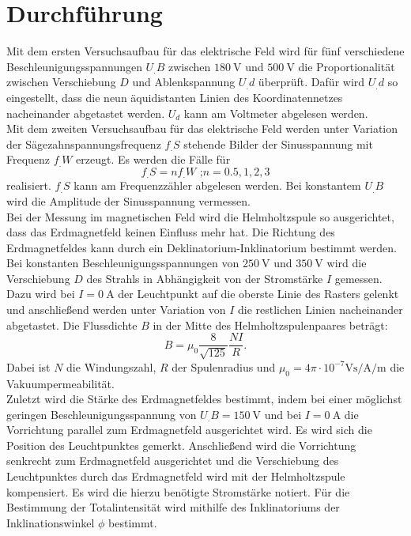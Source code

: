
\section{Durchführung}
\label{sec:Durchführung}

Mit dem ersten Versuchsaufbau für das elektrische Feld wird für fünf verschiedene Beschleunigungsspannungen $U_.B$ zwischen $\SI{180}{\volt}$ und $\SI{500}{\volt}$ die Proportionalität zwischen Verschiebung $D$ und Ablenkspannung $U_.d$ überprüft.
Dafür wird $U_.d$ so eingestellt, dass die neun äquidistanten Linien des Koordinatennetzes nacheinander abgetastet werden. $U_d$ kann am Voltmeter abgelesen werden.\\
Mit dem zweiten Versuchsaufbau für das elektrische Feld werden unter Variation der Sägezahnspannungsfrequenz $f_.S$ stehende Bilder der Sinusspannung mit Frequenz $f_.W$ erzeugt. Es werden die Fälle für 
\[
f_.S = nf_.W \text{ ;} n=0.5,1,2,3
\]
realisiert. $f_.S$ kann am Frequenzzähler abgelesen werden. 
Bei konstantem $U_.B$ wird die Amplitude der Sinusspannung vermessen.\\
Bei der Messung im magnetischen Feld wird die Helmholtzspule so ausgerichtet, dass das Erdmagnetfeld keinen Einfluss mehr hat. Die Richtung des Erdmagnetfeldes kann durch ein Deklinatorium-Inklinatorium bestimmt werden. Bei konstanten Beschleunigungsspannungen von $\SI{250}{\volt}$ und $\SI{350}{\volt}$ wird die Verschiebung $D$ des Strahls in Abhängigkeit von der Stromstärke $I$ gemessen. Dazu wird bei $I=\SI{0}{\ampere}$ der Leuchtpunkt auf die oberste Linie des Rasters gelenkt und anschließend werden unter Variation von $I$ die restlichen Linien nacheinander abgetastet. Die Flussdichte $B$ in der Mitte des Helmholtzspulenpaares beträgt:
\begin{equation}
B = \mu_0\frac{8}{\sqrt{125}}\frac{NI}{R}\text{.}
\end{equation}
Dabei ist $N$ die Windungszahl, $R$ der Spulenradius und $\mu_0=4\pi\cdot 10^{-7}\si{\volt\second\per\ampere\per\metre}$ die Vakuumpermeabilität.\\
Zuletzt wird die Stärke des Erdmagnetfeldes bestimmt, indem bei einer möglichst geringen Beschleunigungsspannung von $U_.B = \SI{150}{\volt}$ und bei $I=\SI{0}{\ampere}$ die Vorrichtung parallel zum Erdmagnetfeld ausgerichtet wird. Es wird sich die Position des Leuchtpunktes gemerkt. Anschließend wird die Vorrichtung senkrecht zum Erdmagnetfeld ausgerichtet und die Verschiebung des Leuchtpunktes durch das Erdmagnetfeld wird mit der Helmholtzspule kompensiert. Es wird die hierzu benötigte Stromstärke notiert.
Für die Bestimmung der Totalintensität wird mithilfe des Inklinatoriums der Inklinationswinkel $\phi$ bestimmt.    